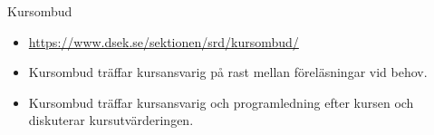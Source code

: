 
\ifkompendium\else
{}
\begin{SlideExtra}{Kursombud}
\begin{itemize}
\item \url{https://www.dsek.se/sektionen/srd/kursombud/}
\item Kursombud träffar kursansvarig på rast mellan föreläsningar vid behov.
\item Kursombud träffar kursansvarig och programledning efter kursen och diskuterar kursutvärderingen.
\end{itemize}
\end{SlideExtra}
\fi
